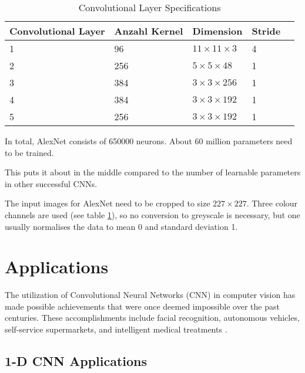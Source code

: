\begin{table} [H]
	\centering
	\begin{tabular} {l l l l l}
		Convolutional Layer & Anzahl Kernel & Dimension & Stride \\ \hline
		1 & 96 & $11\times11\times3$ & 4\\
		2 & 256 & $5\times5\times48$ & 1\\
		3 & 384 & $3\times3\times256$ & 1\\
		4 & 384 & $3\times3\times192$ & 1\\
		5 & 256 & $3\times3\times192$ & 1\\
	\end{tabular}
	\caption{Convolutional Layer Specifications}
	\label{ConvAlex}
\end{table}

In total, AlexNet consists of 650000 neurons. About 60 million parameters need to be trained. \cite{Krizhevsky:2012}

This puts it about in the middle compared to the number of learnable parameters in other successful CNNs.


The input images for AlexNet need to be cropped to size $227 \times 227$. Three colour channels are used (see table \ref{ConvAlex}), so no conversion to greyscale is necessary, but one usually normalises the data to mean 0 and standard deviation 1.\cite{Alake:2020}

\section{Applications}

The utilization of Convolutional Neural Networks (CNN) in computer vision has made possible achievements that were once deemed impossible over the past centuries. These accomplishments include facial recognition, autonomous vehicles, self-service supermarkets, and intelligent medical treatments \cite{Li:2021}.

\subsection{1-D CNN Applications}

